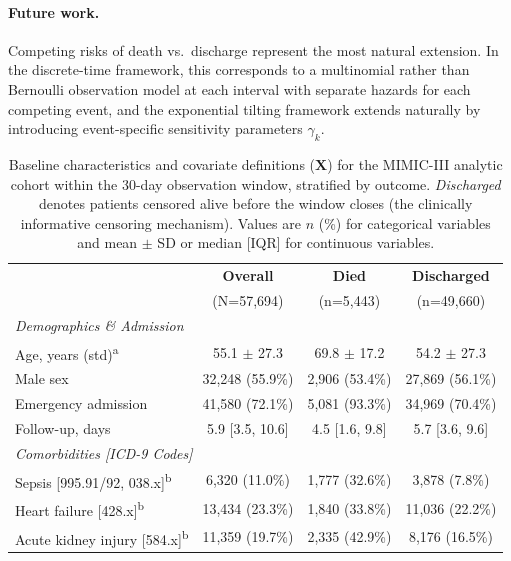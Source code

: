 \documentclass[twoside,11pt]{article}
\begin{document}
\paragraph{Future work.}
Competing risks of death vs.\ discharge represent the most natural extension. In the discrete-time framework, this corresponds to a multinomial rather than Bernoulli observation model at each interval with separate hazards for each competing event, and the exponential tilting framework extends naturally by introducing event-specific sensitivity parameters $\gamma_k$.
 


\begin{table}[ht!]
\centering
\footnotesize
\setlength{\tabcolsep}{4pt}
\renewcommand{\arraystretch}{0.95}
\caption{Baseline characteristics and covariate definitions ($\mathbf{X}$) for the MIMIC-III analytic cohort within the 30-day observation window, stratified by outcome. \emph{Discharged} denotes patients censored alive before the window closes (the clinically informative censoring mechanism). Values are $n$ (\%) for categorical variables and mean $\pm$ SD or median [IQR] for continuous variables.}
\label{tab:cohort}
\begin{tabular}{l c c c}
\toprule
 & \textbf{Overall} & \textbf{Died} & \textbf{Discharged} \\
 & (N=57,694) & (n=5,443) & (n=49,660) \\
\midrule
\multicolumn{4}{l}{\textit{Demographics \& Admission}} \\
\quad Age, years (std)\textsuperscript{a} & 55.1 $\pm$ 27.3 & 69.8 $\pm$ 17.2 & 54.2 $\pm$ 27.3 \\
\quad Male sex & 32,248 (55.9\%) & 2,906 (53.4\%) & 27,869 (56.1\%) \\
\quad Emergency admission & 41,580 (72.1\%) & 5,081 (93.3\%) & 34,969 (70.4\%) \\
\quad Follow-up, days & 5.9 [3.5, 10.6] & 4.5 [1.6, 9.8] & 5.7 [3.6, 9.6] \\
\midrule
\multicolumn{4}{l}{\textit{Comorbidities [ICD-9 Codes]}} \\
\quad Sepsis [995.91/92, 038.x]\textsuperscript{b} & 6,320 (11.0\%) & 1,777 (32.6\%) & 3,878 (7.8\%) \\
\quad Heart failure [428.x]\textsuperscript{b} & 13,434 (23.3\%) & 1,840 (33.8\%) & 11,036 (22.2\%) \\
\quad Acute kidney injury [584.x]\textsuperscript{b} & 11,359 (19.7\%) & 2,335 (42.9\%) & 8,176 (16.5\%) \\

\end{tabular}
\end{table}
\end{document}
